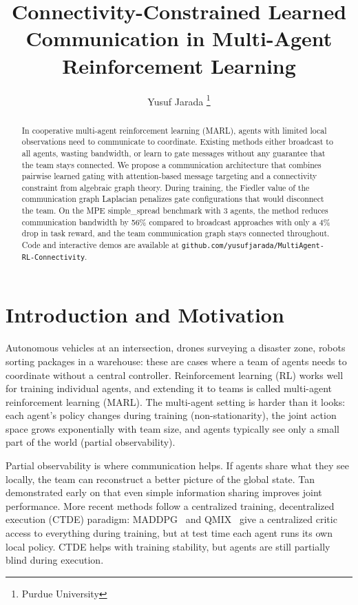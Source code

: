 \documentclass[letterpaper, 10 pt, journal, twoside]{IEEEtran}
\title{Connectivity-Constrained Learned Communication in Multi-Agent Reinforcement Learning}
\author{Yusuf Jarada \thanks{Purdue University}}
\begin{document}
\maketitle

\begin{abstract}
In cooperative multi-agent reinforcement learning (MARL), agents with limited local observations need to communicate to coordinate. Existing methods either broadcast to all agents, wasting bandwidth, or learn to gate messages without any guarantee that the team stays connected. We propose a communication architecture that combines pairwise learned gating with attention-based message targeting and a connectivity constraint from algebraic graph theory. During training, the Fiedler value of the communication graph Laplacian penalizes gate configurations that would disconnect the team. On the MPE simple\_spread benchmark with 3 agents, the method reduces communication bandwidth by 56\% compared to broadcast approaches with only a 4\% drop in task reward, and the team communication graph stays connected throughout. Code and interactive demos are available at \texttt{github.com/yusufjarada/MultiAgent-RL-Connectivity}.
\end{abstract}

\section{Introduction and Motivation}

Autonomous vehicles at an intersection, drones surveying a disaster zone, robots sorting packages in a warehouse: these are cases where a team of agents needs to coordinate without a central controller. Reinforcement learning (RL) works well for training individual agents, and extending it to teams is called multi-agent reinforcement learning (MARL). The multi-agent setting is harder than it looks: each agent's policy changes during training (non-stationarity), the joint action space grows exponentially with team size, and agents typically see only a small part of the world (partial observability).

Partial observability is where communication helps. If agents share what they see locally, the team can reconstruct a better picture of the global state. Tan~\cite{Tan1993} demonstrated early on that even simple information sharing improves joint performance. More recent methods follow a centralized training, decentralized execution (CTDE) paradigm: MADDPG~\cite{Lowe2017} and QMIX~\cite{Rashid2018} give a centralized critic access to everything during training, but at test time each agent runs its own local policy. CTDE helps with training stability, but agents are still partially blind during execution.
\end{document}
